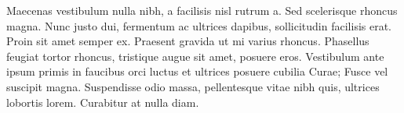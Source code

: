 Maecenas vestibulum nulla nibh, a facilisis nisl rutrum a. Sed scelerisque rhoncus magna. Nunc justo dui, fermentum ac ultrices dapibus, sollicitudin facilisis erat. Proin sit amet semper ex. Praesent gravida ut mi varius rhoncus. Phasellus feugiat tortor rhoncus, tristique augue sit amet, posuere eros. Vestibulum ante ipsum primis in faucibus orci luctus et ultrices posuere cubilia Curae; Fusce vel suscipit magna. Suspendisse odio massa, pellentesque vitae nibh quis, ultrices lobortis lorem. Curabitur at nulla diam. 



